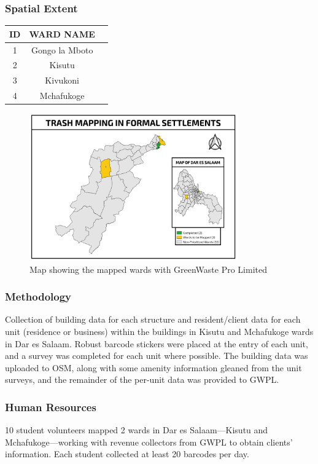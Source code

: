 \documentclass[a4paper,12pt,twoside]{article}
\begin{document}
\subsubsection{Spatial Extent}

\begin{center}
\begin{tabular}{|c|c|c|}
\hline
ID & WARD NAME\\
\hline
1 & Gongo la Mboto\\
\hline
2 & Kisutu\\
\hline
3 & Kivukoni\\
\hline
4 & Mchafukoge\\
 \hline
\end{tabular}
\end{center}

\begin{figure}[h]
  \color{RHgreen}\caption{Map showing the mapped wards with GreenWaste Pro Limited}
  \centering
 \includegraphics[width=0.8\textwidth]{images/GWPL.png}
\end{figure}

\subsubsection{Methodology}

Collection of building data for each structure and resident/client data for each unit (residence or business) within the buildings in Kisutu and Mchafukoge wards in Dar es Salaam. Robust barcode stickers were placed at the entry of each unit, and a survey was completed for each unit where possible. The building data was uploaded to OSM, along with some amenity information gleaned from the unit surveys, and the remainder of the per-unit data was provided to GWPL.

\subsubsection{Human Resources}
10 student volunteers mapped 2 wards in Dar es Salaam---Kisutu and Mchafukoge---working with revenue collectors from GWPL to obtain clients’ information. Each student collected at least 20 barcodes per day.
\end{document}
